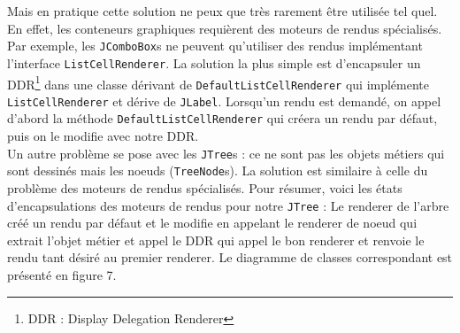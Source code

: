 \documentclass{article}
\begin{document}
Mais en pratique cette solution ne peux que très rarement être utilisée tel quel. En effet, les conteneurs graphiques requièrent des moteurs de rendus spécialisés. Par exemple, les \texttt{JComboBox}s ne peuvent qu'utiliser des rendus implémentant l'interface \texttt{ListCellRenderer}. La solution la plus simple est d'encapsuler un DDR\footnote{DDR : Display Delegation Renderer} dans une classe dérivant de \texttt{DefaultListCellRenderer} qui implémente \texttt{ListCellRenderer} et dérive de \texttt{JLabel}. Lorsqu'un rendu est demandé, on appel d'abord la méthode \texttt{DefaultListCellRenderer} qui créera un rendu par défaut, puis on le modifie avec notre DDR.\\
Un autre problème se pose avec les \texttt{JTree}s : ce ne sont pas les objets métiers qui sont dessinés mais les noeuds (\texttt{TreeNode}s). La solution est similaire à celle du problème des moteurs de rendus spécialisés. Pour résumer, voici les états d'encapsulations des moteurs de rendus pour notre \texttt{JTree} : Le renderer de l'arbre créé un rendu par défaut et le modifie en appelant le renderer de noeud qui extrait l'objet métier et appel le DDR qui appel le bon renderer et renvoie le rendu tant désiré au premier renderer.
Le diagramme de classes correspondant est présenté en figure 7.
\end{document}
